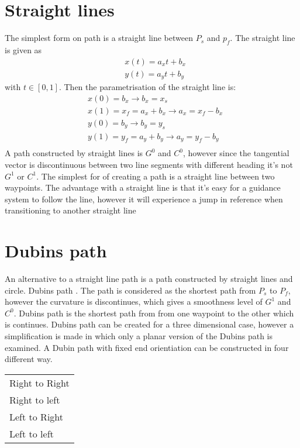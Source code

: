 \section{Straight lines}
The simplest form on path is a straight line between $P_s$ and $p_f$. The straight line is given as 
\begin{subequations}
\begin{align}
& x(t) = a_xt + b_x \\
& y(t) = a_yt + b_y 
\end{align}
\end{subequations}
with $ t \in [0,1] $. Then the parametrisation of the straight line is:
\begin{subequations}
\begin{align}
& x(0) = b_x \rightarrow b_x = x_s \\
& x(1) = x_f = a_x + b_x \rightarrow a_x = x_f - b_x \\
& y(0) = b_y \rightarrow b_y = y_s \\
& y(1) = y_f = a_y + b_y \rightarrow a_y = y_f - b_y \\
\end{align}
\end{subequations}
A path constructed by straight lines is $G^0$ and $C^0$, however since the tangential vector is discontinuous between two line segments with different heading it's not $G^1$ or $C^1$.
The simplest for of creating a path is a straight line between two waypoints. The advantage with a straight line is that it's easy for a guidance system to follow the line, however it will experience a jump in reference when transitioning to another straight line
\section{Dubins path}
An alternative to a straight line path is a path constructed by straight lines and circle. Dubins path \citep{dubins1957curves}. The path is considered as the shortest path from $P_s$ to $P_f$, however the curvature is discontinues, which gives a smoothness level of $G^1$ and $C^0$. 
Dubins path is the shortest path from from one waypoint to the other which is continues. Dubins path can be created for a three dimensional case, however a simplification is made in which only a planar version of the Dubins path is examined. A Dubin path with fixed end orientiation can be constructed in four different way.
\begin{table}[H]
\centering
\begin{adjustbox}{max width=\textwidth}
\begin{tabular}{ | l |}
\hline
Right to Right \\
Right to left \\
Left to Right \\
Left to left \\ \hline
\end{tabular}
\end{adjustbox}
\end{table}

